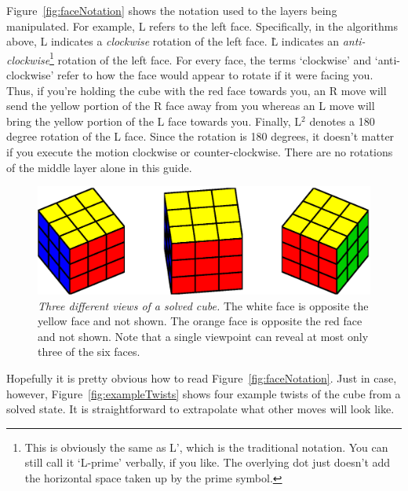 \documentclass[paper=a4, fontsize=11pt, parskip=full]{scrartcl} %
\newcommand*{\A}{\fontfamily{pcr}\selectfont} %
\newcommand{\2}{\ensuremath{^2}} %
\begin{document}
Figure~\ref{fig:faceNotation} shows the notation used to the layers 
being manipulated. For example, {\A L} refers to the left face. 
Specifically, in the algorithms above, {\A L} indicates a \textit{clockwise} 
rotation of the left face.  {\A \.{L}} indicates an \textit{anti-clockwise}\footnote{This is obviously
the same as {\A L'}, which is the traditional notation. You can still call it `L-prime' verbally, if you like. The overlying dot just doesn't add the horizontal space taken up by the prime symbol.}
rotation of the left face. For every face, the terms `clockwise'  and `anti-clockwise' 
refer to how the face would appear to rotate if it were facing you. Thus, if you're holding the 
cube with the red face towards you, an {\A R} move will send
 the yellow portion of the {\A R} face away from you whereas an {\A L} move will 
 bring the yellow portion of  the {\A L} face towards you. Finally, {\A L\2} denotes 
 a 180 degree rotation of the {\A L} face. Since the rotation is 180 degrees, it 
 doesn't matter if you execute the motion clockwise or counter-clockwise. There are no 
 rotations of the middle layer alone in this guide. 

\begin{figure}[h]
\centering
\includegraphics[width=4.5in]{threeViewsOfSolvedCube.eps}
\caption{\textit{Three different views of a solved cube.} The white face is opposite
the yellow face and not shown. The orange face is opposite the red face and not shown. Note that a 
single viewpoint can reveal at most only three of the six faces.}
\label{fig:solved}
\end{figure}


 Hopefully it is pretty obvious how to read Figure~\ref{fig:faceNotation}. Just in case, 
 however, Figure~\ref{fig:exampleTwists} shows four example twists of the cube from
 a solved state. It is straightforward to extrapolate what other moves will look like. 


\clearpage
\end{document}
